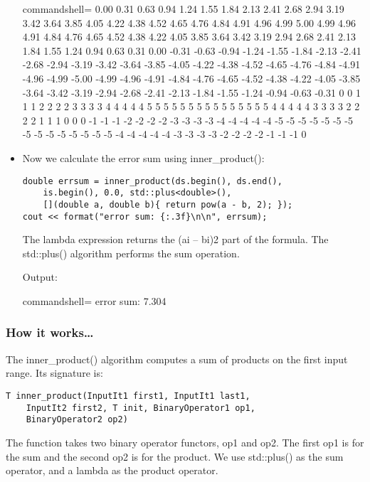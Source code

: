 \begin{itemize}
\begin{tcblisting}{commandshell={}}
0.00 0.31 0.63 0.94 1.24 1.55 1.84 2.13 2.41
2.68 2.94 3.19 3.42 3.64 3.85 4.05 4.22 4.38
4.52 4.65 4.76 4.84 4.91 4.96 4.99 5.00 4.99
4.96 4.91 4.84 4.76 4.65 4.52 4.38 4.22 4.05
3.85 3.64 3.42 3.19 2.94 2.68 2.41 2.13 1.84
1.55 1.24 0.94 0.63 0.31 0.00 -0.31 -0.63 -0.94
-1.24 -1.55 -1.84 -2.13 -2.41 -2.68 -2.94 -3.19 -3.42
-3.64 -3.85 -4.05 -4.22 -4.38 -4.52 -4.65 -4.76 -4.84
-4.91 -4.96 -4.99 -5.00 -4.99 -4.96 -4.91 -4.84 -4.76
-4.65 -4.52 -4.38 -4.22 -4.05 -3.85 -3.64 -3.42 -3.19
-2.94 -2.68 -2.41 -2.13 -1.84 -1.55 -1.24 -0.94 -0.63
-0.31
0 0 1 1 1 2 2 2 2 3 3 3 3 4 4
4 4 4 5 5 5 5 5 5 5 5 5 5 5 5
5 5 5 4 4 4 4 4 3 3 3 3 2 2 2
2 1 1 1 0 0 0 -1 -1 -1 -2 -2 -2 -2 -3
-3 -3 -3 -4 -4 -4 -4 -4 -5 -5 -5 -5 -5 -5
-5 -5 -5 -5 -5 -5 -5 -5 -5 -4 -4 -4 -4 -4
-3 -3 -3 -3 -2 -2 -2 -2 -1 -1 -1 0
\end{tcblisting}

\item 
Now we calculate the error sum using inner\_product():

\begin{lstlisting}[style=styleCXX]
double errsum = inner_product(ds.begin(), ds.end(),
	is.begin(), 0.0, std::plus<double>(),
	[](double a, double b){ return pow(a - b, 2); });
cout << format("error sum: {:.3f}\n\n", errsum);
\end{lstlisting}

The lambda expression returns the (ai – bi)2 part of the formula. The std::plus() algorithm performs the sum operation.

Output:

\begin{tcblisting}{commandshell={}}
error sum: 7.304
\end{tcblisting}
\end{itemize}

\subsubsection{How it works…}

The inner\_product() algorithm computes a sum of products on the first input range. Its signature is:

\begin{lstlisting}[style=styleCXX]
T inner_product(InputIt1 first1, InputIt1 last1,
	InputIt2 first2, T init, BinaryOperator1 op1,
	BinaryOperator2 op2)
\end{lstlisting}

The function takes two binary operator functors, op1 and op2. The first op1 is for the sum and the second op2 is for the product. We use std::plus() as the sum operator, and a lambda as the product operator.

